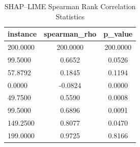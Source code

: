 \begin{table}
\centering
\caption{SHAP–LIME Spearman Rank Correlation Statistics}
\label{tab:agreement}
\begin{tabular}{lcc}
\toprule
instance & spearman_rho & p_value \\
\midrule
200.0000 & 200.0000 & 200.0000 \\
99.5000 & 0.6652 & 0.0526 \\
57.8792 & 0.1845 & 0.1194 \\
0.0000 & -0.0824 & 0.0000 \\
49.7500 & 0.5590 & 0.0008 \\
99.5000 & 0.6896 & 0.0091 \\
149.2500 & 0.8077 & 0.0470 \\
199.0000 & 0.9725 & 0.8166 \\
\bottomrule
\end{tabular}
\end{table}
